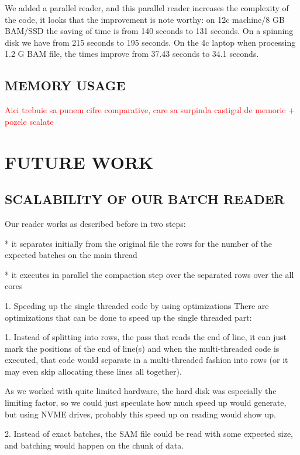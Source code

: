 \documentclass[a4paper,twoside]{article}
\begin{document}
We added a parallel reader, and this parallel reader increases the complexity of the code, it looks that the improvement is note worthy: on 12c machine/8 GB BAM/SSD the saving of time is from 140 seconds to 131 seconds. On a spinning disk we have from 215 seconds to 195 seconds. On the 4c laptop when processing 1.2 G BAM file, the times improve from 37.43 seconds to 34.1 seconds.



\subsection{\uppercase{Memory Usage}}
\textcolor{red} {Aici trebuie sa punem cifre comparative, care sa surpinda castigul de memorie + pozele scalate }


\section{\uppercase{Future work}}

\subsection{\uppercase{Scalability of our batch reader}}

Our reader works as described before in two steps:

* it separates initially from the original file the rows for the number of the expected batches on the main thread

* it executes in parallel the compaction step over the separated rows over the all cores

1. Speeding up the single threaded code by using optimizations
There are optimizations that can be done to speed up the single threaded part: 

1. Instead of splitting into rows, the pass that reads the end of line, it can just mark the positions of the end of line(s) and when the multi-threaded code is executed, 
that code would separate in a multi-threaded fashion into rows (or it may even skip allocating these lines all together). 

As we worked with quite limited hardware, the hard disk was especially the limiting factor, so we could just speculate how much speed up would generate, but using NVME drives, probably this speed up on reading would show up.


2. Instead of exact batches, the SAM file could be read with some expected size, and batching would happen on the chunk of data.
\end{document}
